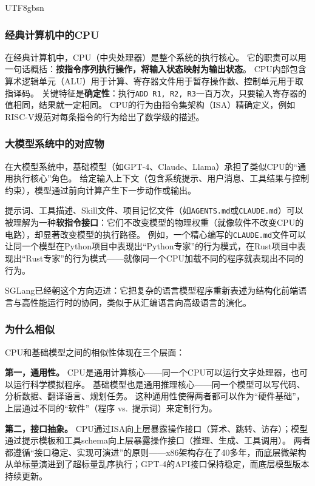 \documentclass[11pt,a4paper]{article}
\begin{document}
\begin{CJK*}{UTF8}{gbsn}
\subsubsection{经典计算机中的CPU}

在经典计算机中，CPU（中央处理器）是整个系统的执行核心。
它的职责可以用一句话概括：\textbf{按指令序列执行操作，将输入状态映射为输出状态}。
CPU内部包含算术逻辑单元（ALU）用于计算、寄存器文件用于暂存操作数、控制单元用于取指译码。
关键特征是\textbf{确定性}：执行\texttt{ADD R1, R2, R3}一百万次，只要输入寄存器的值相同，结果就一定相同。
CPU的行为由指令集架构（ISA）精确定义，例如RISC-V规范对每条指令的行为给出了数学级的描述\cite{riscv_spec_2026}。

\subsubsection{大模型系统中的对应物}

在大模型系统中，基础模型（如GPT-4、Claude、Llama）承担了类似CPU的``通用执行核心''角色。
给定输入上下文（包含系统提示、用户消息、工具结果与控制约束），模型通过前向计算产生下一步动作或输出\cite{vaswani2017attention,brown2020gpt3,llama2023}。

提示词、工具描述、Skill文件、项目记忆文件（如\texttt{AGENTS.md}或\texttt{CLAUDE.md}）可以被理解为一种\textbf{软指令接口}：它们不改变模型的物理权重（就像软件不改变CPU的电路），却显著改变模型的执行路径\cite{openai_codex_agents_md_2026,openai_codex_skills_2026,anthropic_claudecode_memory_2026}。
例如，一个精心编写的\texttt{CLAUDE.md}文件可以让同一个模型在Python项目中表现出``Python专家''的行为模式，在Rust项目中表现出``Rust专家''的行为模式——就像同一个CPU加载不同的程序就表现出不同的行为。

SGLang已经朝这个方向迈进：它把复杂的语言模型程序重新表述为结构化前端语言与高性能运行时的协同，类似于从汇编语言向高级语言的演化\cite{sglang2024,sglang_docs_2026}。

\subsubsection{为什么相似}

CPU和基础模型之间的相似性体现在三个层面：

\textbf{第一，通用性。}
CPU是通用计算核心——同一个CPU可以运行文字处理器，也可以运行科学模拟程序。
基础模型也是通用推理核心——同一个模型可以写代码、分析数据、翻译语言、规划任务。
这种通用性使得两者都可以作为``硬件基础''，上层通过不同的``软件''（程序 vs.\ 提示词）来定制行为。

\textbf{第二，接口抽象。}
CPU通过ISA向上层暴露操作接口（算术、跳转、访存）；模型通过提示模板和工具schema向上层暴露操作接口（推理、生成、工具调用）。
两者都遵循``接口稳定、实现可演进''的原则——x86架构存在了40多年，而底层微架构从单标量演进到了超标量乱序执行；GPT-4的API接口保持稳定，而底层模型版本持续更新。


\end{CJK*}
\end{document}
